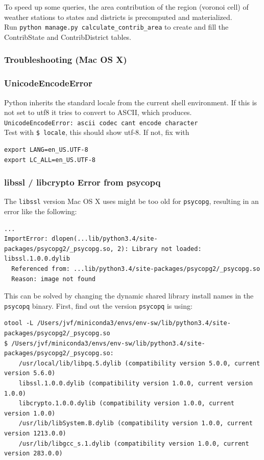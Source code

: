 \documentclass[paper=a4, fontsize=11pt]{scrartcl} %
\numberwithin{equation}{section} %
\numberwithin{figure}{section} %
\numberwithin{table}{section} %
\begin{document}
To speed up some queries, the area contribution of the region (voronoi
cell) of weather stations to states and districts is precomputed and
materialized. \\
Run \texttt{python\ manage.py\ calculate\_contrib\_area}
to create and fill the ContribState and ContribDistrict tables.

\subsubsection*{Troubleshooting (Mac OS X)}\label{troubleshooting}

\subsubsection*{UnicodeEncodeError}\label{unicodeencodeerror}

Python inherits the standard locale from the current shell environment.
If this is not set to utf8 it tries to convert to ASCII, which
produces.\\
\texttt{UnicodeEncodeError:\ \textquotesingle{}ascii\textquotesingle{}\ codec\ can\textquotesingle{}t\ encode\ character}\\Test
with \texttt{\$\ locale}, this should show utf-8. If not, fix with
\begin{verbatim}
export LANG=en_US.UTF-8
export LC_ALL=en_US.UTF-8
\end{verbatim}

\subsubsection*{libssl / libcrypto Error from
psycopq}\label{libssl-libcrypto-error-from-psycopq}

The \texttt{libssl} version Mac OS X uses might be too old for
\texttt{psycopg}, resulting in an error like the following:

\begin{lstlisting}[breaklines=true]
...
ImportError: dlopen(...lib/python3.4/site-packages/psycopg2/_psycopg.so, 2): Library not loaded: libssl.1.0.0.dylib
  Referenced from: ...lib/python3.4/site-packages/psycopg2/_psycopg.so
  Reason: image not found
\end{lstlisting}

This can be solved by changing the dynamic shared library install names
in the \texttt{psycopq} binary. First, find out the version
\texttt{psycopq} is using:

\begin{lstlisting}[breaklines=true]
otool -L /Users/jvf/miniconda3/envs/env-sw/lib/python3.4/site-packages/psycopg2/_psycopg.so
$ /Users/jvf/miniconda3/envs/env-sw/lib/python3.4/site-packages/psycopg2/_psycopg.so:
    /usr/local/lib/libpq.5.dylib (compatibility version 5.0.0, current version 5.6.0)
    libssl.1.0.0.dylib (compatibility version 1.0.0, current version 1.0.0)
    libcrypto.1.0.0.dylib (compatibility version 1.0.0, current version 1.0.0)
    /usr/lib/libSystem.B.dylib (compatibility version 1.0.0, current version 1213.0.0)
    /usr/lib/libgcc_s.1.dylib (compatibility version 1.0.0, current version 283.0.0)
\end{lstlisting}
\end{document}
